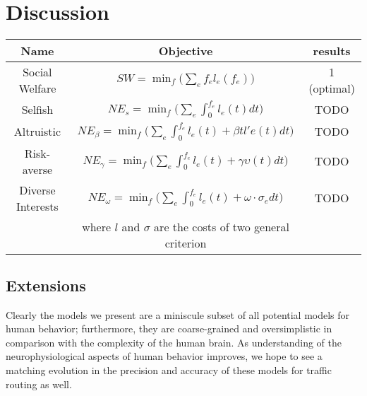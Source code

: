 \section{Discussion}\label{sec:discussion}

\begin{table}
\begin{center}
 \begin{tabular}{|c | c | c|} 
 \hline
 Name & Objective & results \\
 \hline\hline
     Social Welfare & $SW = \min_f\Big(\sum_e f_el_e(f_e)\Big)$ & 1 (optimal) \\
 \hline
     Selfish & $NE_s = \min_f\Big(\sum_e\int_0^{f_e} l_e(t)dt\Big)$ & TODO\\
 \hline
     Altruistic & $NE_\beta = \min_f\Big(\sum_e\int_0^{f_e} l_e(t) + \beta tl'e(t)dt\Big)$ & TODO\\
\hline
     Risk-averse & $NE_\gamma = \min_f\Big(\sum_e\int_0^{f_e} l_e(t) + \gamma\upsilon(t)dt\Big)$ & TODO\\
\hline
     Diverse Interests & $NE_\omega = \min_f\Big(\sum_e\int_0^{f_e} l_e(t) + \omega\cdot \sigma_e dt\Big)$ & TODO\\
     & where $l$ and $\sigma$ are the costs of two general criterion &\\
\hline
\end{tabular}
\end{center}
\end{table}

\subsection{Extensions}
Clearly the models we present are a miniscule subset of all potential models for human behavior; 
furthermore, they are coarse-grained and oversimplistic in comparison with the complexity of the human
brain. As understanding of the neurophysiological aspects of human behavior improves, we hope to see a matching evolution in the precision and accuracy of these models for traffic routing as well.
